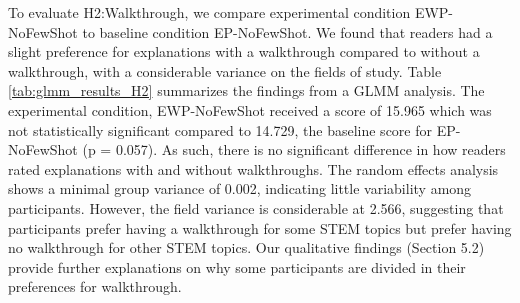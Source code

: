 To evaluate H2:Walkthrough, we compare experimental condition EWP-NoFewShot to baseline condition EP-NoFewShot. We found that readers had a slight preference for explanations with a walkthrough compared to without a walkthrough, with a considerable variance on the fields of study.
Table \ref{tab:glmm_results_H2} summarizes the findings from a GLMM analysis. The experimental condition, EWP-NoFewShot received a score of 15.965 which was not statistically significant compared to 14.729, the baseline score for EP-NoFewShot (p = 0.057). As such, there is no significant difference in how readers rated explanations with and without walkthroughs. The random effects analysis shows a minimal group variance of 0.002, indicating little variability among participants. However, the field variance is considerable at 2.566, suggesting that participants prefer having a walkthrough for some STEM topics but prefer having no walkthrough for other STEM topics. 
Our qualitative findings (Section 5.2) provide further explanations on why some participants are divided in their preferences for walkthrough.  


